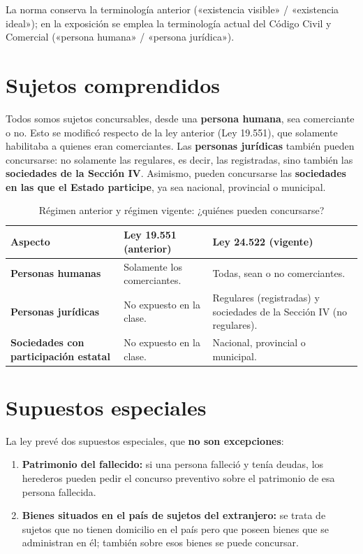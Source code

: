 \documentclass[12pt,oneside]{book}
\begin{document}
\begin{note}
La norma conserva la terminología anterior («existencia visible» / «existencia ideal»); en la exposición se emplea la terminología actual del Código Civil y Comercial («persona humana» / «persona jurídica»).
\end{note}

\section{Sujetos comprendidos}

Todos somos sujetos concursables, desde una \textbf{persona humana}, sea comerciante o no. Esto se modificó respecto de la ley anterior (Ley 19.551), que solamente habilitaba a quienes eran comerciantes. Las \textbf{personas jurídicas} también pueden concursarse: no solamente las regulares, es decir, las registradas, sino también las \textbf{sociedades de la Sección IV}. Asimismo, pueden concursarse las \textbf{sociedades en las que el Estado participe}, ya sea nacional, provincial o municipal.

\begin{table}[H]
\centering
\caption{Régimen anterior y régimen vigente: ¿quiénes pueden concursarse?}
\begin{tabularx}{\textwidth}{>{\raggedright\arraybackslash}p{}>{\raggedright\arraybackslash}X>{\raggedright\arraybackslash}X}
\toprule
\textbf{Aspecto} & \textbf{Ley 19.551 (anterior)} & \textbf{Ley 24.522 (vigente)} \\
\midrule
\textbf{Personas humanas} & Solamente los comerciantes. & Todas, sean o no comerciantes. \\
\textbf{Personas jurídicas} & No expuesto en la clase. & Regulares (registradas) y sociedades de la Sección IV (no regulares). \\
\textbf{Sociedades con participación estatal} & No expuesto en la clase. & Nacional, provincial o municipal. \\
\bottomrule
\end{tabularx}
\end{table}

\section{Supuestos especiales}

La ley prevé dos supuestos especiales, que \textbf{no son excepciones}:

\begin{enumerate}
    \item \textbf{Patrimonio del fallecido:} si una persona falleció y tenía deudas, los herederos pueden pedir el concurso preventivo sobre el patrimonio de esa persona fallecida.
    \item \textbf{Bienes situados en el país de sujetos del extranjero:} se trata de sujetos que no tienen domicilio en el país pero que poseen bienes que se administran en él; también sobre esos bienes se puede concursar.
\end{enumerate}
\end{document}
